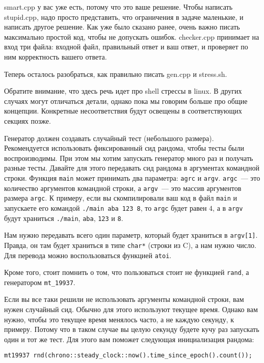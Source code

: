 smart.cpp у вас уже есть, потому что это ваше решение. Чтобы написать stupid.cpp, надо просто представить, что ограничения в задаче маленькие, и написать другое решение. Как уже было сказано ранее, очень важно писать максимально простой код, чтобы не допускать ошибок. checker.cpp принимает на вход три файла: входной файл, правильный ответ и ваш ответ, и проверяет по ним корректность вашего ответа.

Теперь осталось разобраться, как правильно писать gen.cpp и stress.sh.

\begin{observation}
    Обратите внимание, что здесь речь идет про shell стрессы в linux. В других случаях могут отличаться детали, однако пока мы говорим больше про общие концепции. Конкретные несоответствия будут освещены в соответствующих секциях позже.
\end{observation}

Генератор должен создавать случайный тест (небольшого размера). Рекомендуется использовать фиксированный сид рандома, чтобы тесты были воспроизводимы. При этом мы хотим запускать генератор много раз и получать разные тесты. Давайте для этого передавать сид рандома в аргументах командной строки. Функция \verb+main+ может принимать два параметра: \verb+agrc+ и \verb+argv+. \verb+argc+~--- это количество аргументов командной строки, а \verb+argv+~--- это массив аргументов размера \verb+argc+. К примеру, если вы скомпилировали ваш код в файл \verb+main+ и запускаете его командой \verb+./main aba 123 8+, то \verb+argc+ будет равен $4$, а в \verb+argv+ будут храниться \verb+./main+, \verb+aba+, \verb+123+ и \verb+8+.

Нам нужно передавать всего один параметр, который будет храниться в \verb+argv[1]+. Правда, он там будет храниться в типе \verb+char*+ (строки из C), а нам нужно число. Для перевода можно воспользоваться функцией \verb+atoi+.

Кроме того, стоит помнить о том, что пользоваться стоит не функцией \verb+rand+, а генератором \verb+mt_19937+.

Если вы все таки решили не использовать аргументы командной строки, вам нужен случайный сид. Обычно для этого используют текущее время. Однако вам нужно, чтобы это текущее время менялось часто, а не каждую секунду, к примеру. Потому что в таком случае вы целую секунду будете кучу раз запускать один и тот же тест. Для этого вам поможет следующая инициализация рандома:

\verb+mt19937 rnd(chrono::steady_clock::now().time_since_epoch().count());+

